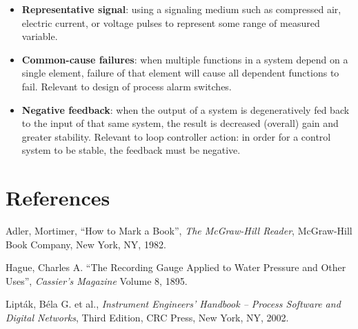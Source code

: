 \begin{itemize}
\item \textbf{Representative signal}: using a signaling medium such as compressed air, electric current, or voltage pulses to represent some range of measured variable.
\item \textbf{Common-cause failures}: when multiple functions in a system depend on a single element, failure of that element will cause all dependent functions to fail.  Relevant to design of process alarm switches.
\item \textbf{Negative feedback}: when the output of a system is degeneratively fed back to the input of that same system, the result is decreased (overall) gain and greater stability.  Relevant to loop controller action: in order for a control system to be stable, the feedback must be negative.
\end{itemize}







\filbreak
\section*{References}


\noindent
Adler, Mortimer, ``How to Mark a Book'', \textit{The McGraw-Hill Reader}, McGraw-Hill Book Company, New York, NY, 1982.

\vskip 10pt

\noindent
Hague, Charles A. ``The Recording Gauge Applied to Water Pressure and Other Uses'', \textit{Cassier's Magazine} Volume 8, 1895.

\vskip 10pt

\noindent
Lipt\'ak, B\'ela G. et al., \textit{Instrument Engineers' Handbook -- Process Software and Digital Networks}, Third Edition, CRC Press, New York, NY, 2002.













